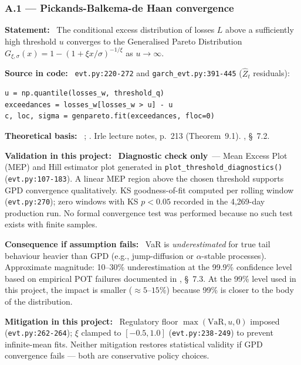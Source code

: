 \documentclass[11pt,a4paper]{article}
\newcommand{\asmfield}[1]{\medskip\noindent\textbf{#1:}\ }
\newcommand{\code}[1]{\texttt{#1}}
\newcommand{\diagnostic}{\textbf{Diagnostic check only}}
\begin{document}
\subsubsection{A.1 --- Pickands-Balkema-de Haan convergence}\label{asm:A1}

\asmfield{Statement}
The conditional excess distribution of losses $L$ above a sufficiently
high threshold $u$ converges to the Generalised Pareto Distribution
$G_{\xi,\sigma}(x) = 1 - (1 + \xi x/\sigma)^{-1/\xi}$ as $u \to \infty$.

\asmfield{Source in code}
\code{evt.py:220-272} and \code{garch\_evt.py:391-445} ($\hat{Z}_t$ residuals):
\begin{lstlisting}
u = np.quantile(losses_w, threshold_q)
exceedances = losses_w[losses_w > u] - u
c, loc, sigma = genpareto.fit(exceedances, floc=0)
\end{lstlisting}

\asmfield{Theoretical basis}
\cite{Pickands1975}; \cite{BalkemadeHaan1974}. Irle lecture notes,
p.~213 (Theorem~9.1). \cite{McNeilFreyEmbrechts2005}, \S~7.2.

\asmfield{Validation in this project}
\diagnostic\ --- Mean Excess Plot (MEP) and Hill estimator plot generated
in \code{plot\_threshold\_diagnostics()} (\code{evt.py:107-183}). A linear
MEP region above the chosen threshold supports GPD convergence
qualitatively. KS goodness-of-fit computed per rolling window
(\code{evt.py:270}); zero windows with KS $p < 0.05$ recorded in the
4{,}269-day production run. No formal convergence test was performed
because no such test exists with finite samples.

\asmfield{Consequence if assumption fails}
VaR is \emph{underestimated} for true tail behaviour heavier than GPD
(e.g., jump-diffusion or $\alpha$-stable processes). Approximate
magnitude: 10--30\% underestimation at the 99.9\% confidence level based
on empirical POT failures documented in \cite{McNeilFreyEmbrechts2005},
\S~7.3. At the 99\% level used in this project, the impact is smaller
($\approx 5$--$15\%$) because 99\% is closer to the body of the
distribution.

\asmfield{Mitigation in this project}
Regulatory floor $\max(\text{VaR}, u, 0)$ imposed (\code{evt.py:262-264});
$\xi$ clamped to $[-0.5, 1.0]$ (\code{evt.py:238-249}) to prevent
infinite-mean fits. Neither mitigation restores statistical validity if GPD
convergence fails --- both are conservative policy choices.

\end{document}
